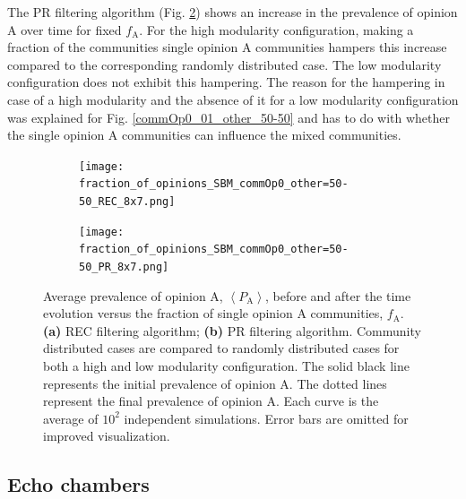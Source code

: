 \documentclass[11 pt , letterpaper , twoside , openright]{book}
\begin{document}
\newline
The PR filtering algorithm (Fig. \ref{pr_comm}) shows an increase in the prevalence of opinion A over time for fixed $f_\text{A}$. For the high modularity configuration, making a fraction of the communities single opinion A communities hampers this increase compared to the corresponding randomly distributed case. The low modularity configuration does not exhibit this hampering. The reason for the hampering in case of a high modularity and the absence of it for a low modularity configuration was explained for Fig. \ref{commOp0_01_other_50-50} and has to do with whether the single opinion A communities can influence the mixed communities. 

\begin{figure}[H]
  \begin{subfigure}[b]{0.49\textwidth}
    \caption{}
  	\texttt{[image: fraction\_of\_opinions\_SBM\_commOp0\_other=50-50\_REC\_8x7.png]}
    \label{rec_comm}
  \end{subfigure}
  \begin{subfigure}[b]{0.49\textwidth}
    \caption{}
  	\texttt{[image: fraction\_of\_opinions\_SBM\_commOp0\_other=50-50\_PR\_8x7.png]}
    \label{pr_comm}
  \end{subfigure}
  \captionsetup{format=plain}
  \caption[Average prevalence of opinion A before and after the time evolution versus the fraction of single opinion A communities. Community distributed cases are compared to randomly distributed cases for both a high and low modularity configuration. Results for the REC and PR filtering algorithms.]{Average prevalence of opinion A, $\left<P_\text{A}\right>$, before and after the time evolution versus the fraction of single opinion A communities, $f_\text{A}$. \textbf{(a)} REC filtering algorithm; \textbf{(b)} PR filtering algorithm. Community distributed cases are compared to randomly distributed cases for both a high and low modularity configuration. The solid black line represents the initial prevalence of opinion A. The dotted lines represent the final prevalence of opinion A. Each curve is the average of $10^2$ independent simulations. Error bars are omitted for improved visualization.}
\label{fracOp0_vs_commOp0_other_50-50}
\end{figure}

\subsection{Echo chambers}\label{groupVSrandomECHO}
\end{document}
